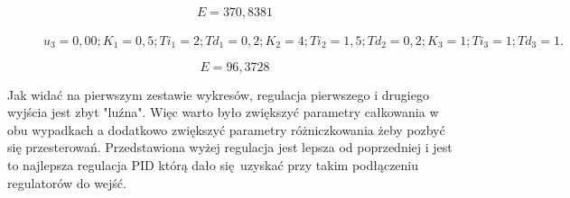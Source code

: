 \begin{equation}
    E = 370,8381
\end{equation}

%     


%     


\begin{figure}[H]
    \centering
    
    \caption{$u_3 = 0,00; K_1 = 0,5; Ti_1 = 2; Td_1 = 0,2; K_2 = 4; Ti_2 = 1,5; Td_2 = 0,2; K_3 = 1; Ti_3 = 1; Td_3 = 1.$}
\end{figure}

\begin{equation}
    E = 96,3728
\end{equation}

Jak widać na pierwszym zestawie wykresów, regulacja pierwszego i drugiego wyjścia jest zbyt "luźna". Więc warto było zwiększyć parametry całkowania w obu wypadkach a dodatkowo zwiększyć parametry różniczkowania żeby pozbyć się przesterowań.
Przedstawiona wyżej regulacja jest lepsza od poprzedniej i jest to najlepsza regulacja PID którą dało się uzyskać przy takim podłączeniu regulatorów do wejść.

